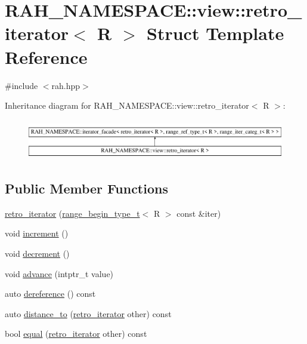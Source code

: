\hypertarget{struct_r_a_h___n_a_m_e_s_p_a_c_e_1_1view_1_1retro__iterator}{}\section{R\+A\+H\+\_\+\+N\+A\+M\+E\+S\+P\+A\+CE\+::view\+::retro\+\_\+iterator$<$ R $>$ Struct Template Reference}
\label{struct_r_a_h___n_a_m_e_s_p_a_c_e_1_1view_1_1retro__iterator}


{\ttfamily \#include $<$rah.\+hpp$>$}

Inheritance diagram for R\+A\+H\+\_\+\+N\+A\+M\+E\+S\+P\+A\+CE\+::view\+::retro\+\_\+iterator$<$ R $>$\+:\begin{figure}[H]
\begin{center}
\leavevmode
\includegraphics[height=1.752739cm]{struct_r_a_h___n_a_m_e_s_p_a_c_e_1_1view_1_1retro__iterator}
\end{center}
\end{figure}
\subsection*{Public Member Functions}
\begin{DoxyCompactItemize}
\item 
\mbox{\hyperlink{struct_r_a_h___n_a_m_e_s_p_a_c_e_1_1view_1_1retro__iterator_adb9205eb961750d70b557e4feb097e90}{retro\+\_\+iterator}} (\mbox{\hyperlink{namespace_r_a_h___n_a_m_e_s_p_a_c_e_a46705781d6869d5151141f871ced1e9c}{range\+\_\+begin\+\_\+type\+\_\+t}}$<$ R $>$ const \&iter)
\item 
void \mbox{\hyperlink{struct_r_a_h___n_a_m_e_s_p_a_c_e_1_1view_1_1retro__iterator_a9eb8615dcaec398cc57595dcb7822af2}{increment}} ()
\item 
void \mbox{\hyperlink{struct_r_a_h___n_a_m_e_s_p_a_c_e_1_1view_1_1retro__iterator_acc9b3287cf662c34313077a70594ad95}{decrement}} ()
\item 
void \mbox{\hyperlink{struct_r_a_h___n_a_m_e_s_p_a_c_e_1_1view_1_1retro__iterator_abcb1e1453c7577e8a79ebad3f81ead98}{advance}} (intptr\+\_\+t value)
\item 
auto \mbox{\hyperlink{struct_r_a_h___n_a_m_e_s_p_a_c_e_1_1view_1_1retro__iterator_a1e188574ae18f045816f0181224bcc36}{dereference}} () const
\item 
auto \mbox{\hyperlink{struct_r_a_h___n_a_m_e_s_p_a_c_e_1_1view_1_1retro__iterator_a5332cbcf2b00984baeac1c823c163a1c}{distance\+\_\+to}} (\mbox{\hyperlink{struct_r_a_h___n_a_m_e_s_p_a_c_e_1_1view_1_1retro__iterator}{retro\+\_\+iterator}} other) const
\item 
bool \mbox{\hyperlink{struct_r_a_h___n_a_m_e_s_p_a_c_e_1_1view_1_1retro__iterator_aaf1567eb8cf804b198bef2892e024064}{equal}} (\mbox{\hyperlink{struct_r_a_h___n_a_m_e_s_p_a_c_e_1_1view_1_1retro__iterator}{retro\+\_\+iterator}} other) const
\end{DoxyCompactItemize}
